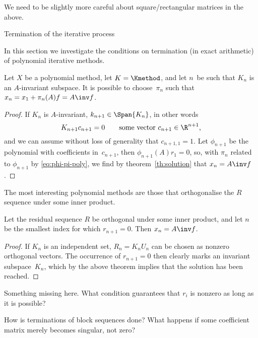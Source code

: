 \begin{question}
We need to be slightly more careful about square/rectangular matrices
in the above.
\end{question}

 {Termination of the iterative process}
\label{sec:termination}

In this section we investigate the conditions on termination (in exact
arithmetic) of polynomial iterative methods.

\begin{theorem}\label{th:invariant}
Let $X$ be a polynomial method,
let $K=\Kmethod$, and let $n$~be such that $K_n$ is an $A$-invariant
subspace.  It is possible to choose~$\pi_n$ such that
$x_n=x_1+\pi_n(A)f=A\inv f$.
\end{theorem}
\begin{proof}
If $K_n$ is $A$-invariant, $k_{n+1}\in\Span{K_n}$, in other words
\[ K_{n+1}c_{n+1}=0\qquad\hbox{some vector $c_{n+1}\in\R^{n+1}$,} \]
and we can assume without loss of generality that $c_{n+1,1}=1$.
Let $\phi_{n+1}$ be the polynomial with coefficients in~$c_{n+1}$,
then $\phi_{n+1}(A)r_1=0$, so, with $\pi_n$ related to $\phi_{n+1}$
by \eqref{eq:phi-pi-poly}, we find by theorem~\ref{th:solution}
that $x_n=A\inv f$.
\end{proof}

The most interesting polynomial methods are those that orthogonalise
the $R$ sequence under some inner product.
\begin{corollary}
\label{cor:solution}
Let the residual sequence $R$ be orthogonal under some inner product,
and let $n$ be the smallest index for which $r_{n+1}=0$. Then $x_n=A\inv f$.
\end{corollary}
\begin{proof}
If $K_n$ is an independent set, $R_n=K_nU_n$ can be chosen
as nonzero orthogonal vectors. The occurrence of $r_{n+1}=0$
then clearly marks an invariant subspace~$K_n$, which by the above
theorem implies that the solution has been reached.
\end{proof}
 
\begin{question}
Something missing here. What condition guarantees that $r_i$ is
nonzero as long as it is possible?
\end{question}

\begin{question}
How is terminations of block sequences done? What happens if 
some coefficient matrix merely becomes singular, not zero?
\end{question}

